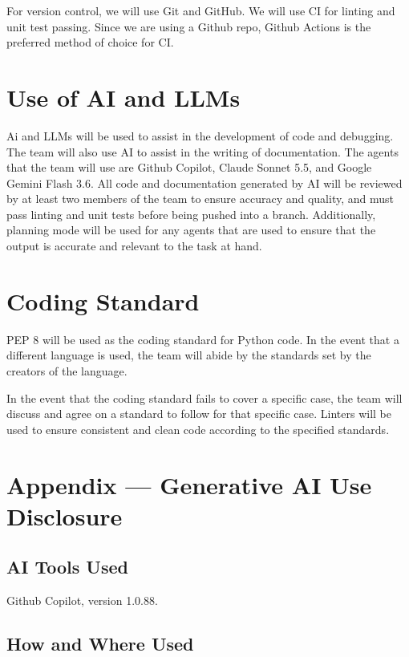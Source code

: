 \documentclass{article}
\begin{document}
For version control, we will use Git and GitHub. We will use CI for linting and unit test passing. Since we are using a Github repo, Github Actions is the preferred method of choice for CI. 

\section{Use of AI and LLMs}

Ai and LLMs will be used to assist in the development of code and debugging. The team will also use AI to assist in the writing of documentation. The agents that the team will use are Github Copilot, Claude Sonnet 5.5, and Google Gemini Flash 3.6.
All code and documentation generated by AI will be reviewed by at least two members of the team to ensure accuracy and quality, and must pass linting and unit tests before being pushed into a branch. Additionally, planning mode will be used for any
agents that are used to ensure that the output is accurate and relevant to the task at hand.

\section{Coding Standard}

PEP 8 will be used as the coding standard for Python code. In the event that a different language is used, the team will abide by the standards set by the creators of the language.

In the event that the coding standard fails to cover a specific case, the team will discuss and agree on a standard to follow for that specific case. Linters will be used to ensure consistent and clean code according to the specified standards.

\newpage{}

\section{Appendix --- Generative AI Use Disclosure}

\subsection{AI Tools Used}

Github Copilot, version 1.0.88.

\subsection{How and Where Used}
\end{document}
